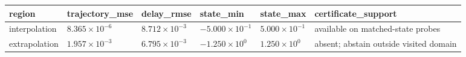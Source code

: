 \begin{tabular}{llllll}
\toprule
region & trajectory\_mse & delay\_rmse & state\_min & state\_max & certificate\_support \\
\midrule
interpolation & \(8.365\times10^{-6}\) & \(8.712\times10^{-3}\) & \(-5.000\times10^{-1}\) & \(5.000\times10^{-1}\) & available on matched-state probes \\
extrapolation & \(1.957\times10^{-3}\) & \(6.795\times10^{-3}\) & \(-1.250\times10^{0}\) & \(1.250\times10^{0}\) & absent; abstain outside visited domain \\
\bottomrule
\end{tabular}
